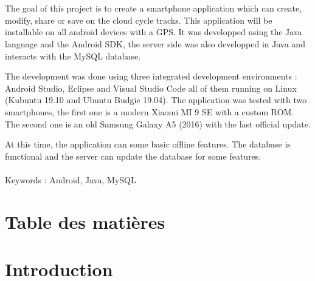 \documentclass[a4paper, 12pt]{report}
\begin{document}
\section*{}
\indent
  The goal of this project is to create a smartphone application which can create, modify, share or save on the cloud cycle tracks. 
  This application will be installable on all android devices with a GPS. 
  It was developped using the Java language and the Android SDK, the server side was also developped in Java and interacts with the MySQL database.
  \\\par
  The development was done using three integrated development environments : Android Studio, Eclipse and Visual Studio Code all of them running on Linux (Kubuntu 19.10 and Ubuntu Budgie 19.04).
  The application was tested with two smartphones, the first one is a modern Xiaomi MI 9 SE with a custom ROM. The second one is an old Samsung Galaxy A5 (2016) with the last official update.
  \\\par
  At this time, the application can some basic offline features. The database is functional and the server can update the database for some features.
  \\\\
  Keywords : Android, Java, MySQL
\newpage
\section*{Table des matières}
\section*{Introduction}

\newpage







\newpage

\end{document}
